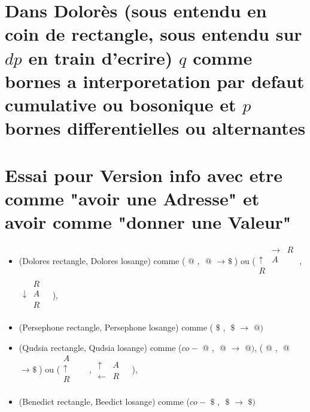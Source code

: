 \documentclass{article}
\begin{document}
   \section{ Dans Dolorès (sous entendu en coin de rectangle, sous entendu sur $dp$ en train d'ecrire) $q$ comme bornes a interporetation par defaut  cumulative ou bosonique  et $p$ bornes differentielles ou alternantes}

\section{Essai pour Version info avec etre comme "avoir une Adresse" et avoir comme "donner une Valeur"}

\begin{itemize}
\item (Dolores rectangle, Dolores losange) comme   ($\text{ @}$  , $\text{ @}$  $\rightarrow \text{ \$}$)  ou 
\subitem($\begin{matrix}
& \rightarrow&R\\
\uparrow&A&\\
R&&\\
\end{matrix}$ , $\begin{matrix}
 &R&\\
\downarrow&A&\\
&R&\\
\end{matrix}$ ),

\item (Persephone rectangle, Persephone losange) comme   ($\text{ \$}$  , $\text{ \$}$  $\rightarrow \text{ @})$
\item (Qudsia rectangle, Qudsia losange) comme   ($co-\text{ @}$  , $\text{ @}$  $\rightarrow \text{ @})$,    ($\text{ @}$  , $\text{ @}$  $\rightarrow \text{ \$}$)
  ou 
  \subitem ($\begin{matrix}
A& &\\
\uparrow&&\\
R&&\\
\end{matrix}$ , $\begin{matrix}
 &&\\
\uparrow&A&\\
\leftarrow&R&\\
\end{matrix}$ ),

\item (Benedict rectangle, Beedict losange) comme   ($co-\text{ \$}$  , $\text{ \$}$  $\rightarrow \text{ \$})$
\end{itemize}
\end{document}
